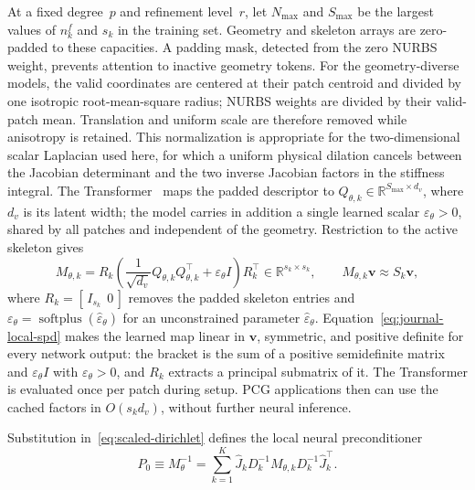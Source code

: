\documentclass{article}
\newcommand{\vect}[1]{\boldsymbol{#1}}
\newcommand{\R}{\mathbb{R}}
\newcommand{\npatch}{K} %
\newcommand{\Jskel}[1]{\widehat{J}_{#1}}         %
\newcommand{\Sloc}[1]{S_{#1}}                    %
\newcommand{\Dmult}[1]{D_{#1}}                   %
\theoremstyle{plain}
\numberwithin{equation}{section}
\begin{document}
At a fixed degree~$p$ and refinement level~$r$, let $N_{\max}$ and $S_{\max}$
be the largest values of $n_k^f$ and $s_k$ in the training set.  Geometry and
skeleton arrays are zero-padded to these capacities.  A padding mask, detected
from the zero NURBS weight, prevents attention to inactive geometry tokens.
For the geometry-diverse models, the valid coordinates are centered at their
patch centroid and divided by one isotropic root-mean-square radius; NURBS
weights are divided by their valid-patch mean.  Translation and uniform scale
are therefore removed while anisotropy is retained.  This normalization is
appropriate for the two-dimensional scalar Laplacian used here, for which a
uniform physical dilation cancels between the Jacobian determinant and the two
inverse Jacobian factors in the stiffness integral.
The Transformer~\cite{vaswani2017attention} maps the padded descriptor to
$Q_{\theta,k}\in\R^{S_{\max}\times d_v}$, where $d_v$ is its latent width; the
model carries in addition a single learned scalar
$\varepsilon_\theta>0$, shared by all patches and independent of the geometry.
Restriction to the active skeleton gives
\begin{equation}
    M_{\theta,k}
    =R_k\left(
    \frac{1}{\sqrt{d_v}}Q_{\theta,k}Q_{\theta,k}^{\top}
    +\varepsilon_\theta I
    \right)R_k^{\top}\in\R^{s_k\times s_k},
    \qquad
    M_{\theta,k}\vect v\approx\Sloc{k}\vect v,
    \label{eq:journal-local-spd}
\end{equation}
where $R_k=[\,I_{s_k}\ \ 0\,]$ removes the padded skeleton entries and
$\varepsilon_\theta=\operatorname{softplus}(\widehat\varepsilon_\theta)$ for an
unconstrained parameter $\widehat\varepsilon_\theta$.
Equation~\eqref{eq:journal-local-spd} makes the learned map linear in
$\vect v$, symmetric, and positive definite for every network output: the
bracket is the sum of a positive semidefinite matrix and
$\varepsilon_\theta I$ with $\varepsilon_\theta>0$, and $R_k$ extracts a
principal submatrix of it.  The
Transformer is evaluated once per patch during setup.  PCG applications then
can use the cached factors in $O(s_kd_v)$, without further neural inference.

Substitution in~\eqref{eq:scaled-dirichlet} defines the local neural
preconditioner
\begin{equation}
    P_0\equiv M_{\theta}^{-1}
    =\sum_{k=1}^{\npatch}
    \Jskel{k}\Dmult{k}^{-1}M_{\theta,k}
    \Dmult{k}^{-1}\Jskel{k}^{\top}.
    \label{eq:journal-p0}
\end{equation}
\end{document}
